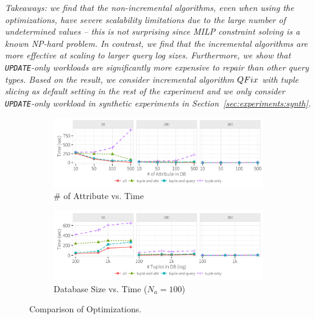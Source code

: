 {\it Takeaways: we find that the non-incremental \sys algorithms, even when using the optimizations,
have severe scalability limitations due to the large number of undetermined values -- this is not surprising
since MILP constraint solving is a known NP-hard problem.
In contrast, we find that the incremental algorithms are more effective at scaling to larger query log sizes.  
Furthermore, we show that \texttt{UPDATE}-only workloads are significantly more expensive to repair than other 
query types. Based on the result, we consider incremental
algorithm $QFix$ with tuple slicing as default setting in the rest of the experiment and we only consider \texttt{UPDATE}-only workload in synthetic experiments in Section~\ref{sec:experiments:synth}. 
}

 \begin{figure}[h]
    \vspace*{-.1in}
    \centering
    \begin{subfigure}[t]{.45\textwidth}
    \includegraphics[width = .99\columnwidth]{figures/attr_time}
    \vspace*{-.1in}
    \caption{\# of Attribute vs. Time}
    \label{f:attr} 
    \end{subfigure}
    \begin{subfigure}[t]{.45\textwidth}
    \includegraphics[width = .99\columnwidth]{figures/attr100_time}
    \vspace*{-.1in}
    \caption{Database Size vs. Time ($N_a = 100$)}
    \label{f:attr100} 
    \end{subfigure}
    \vspace*{-.1in}
    \caption{Comparison of Optimizations. }
  \end{figure}
  
